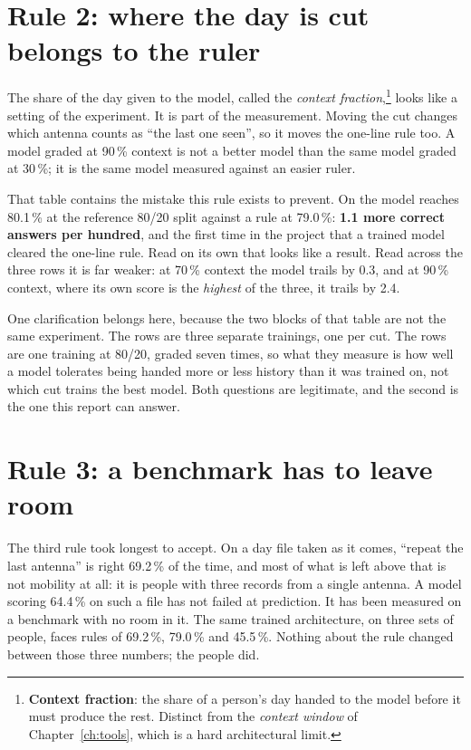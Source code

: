 \section{Rule 2: where the day is cut belongs to the ruler}

The share of the day given to the model, called the \emph{context
fraction},\footnote{\textbf{Context fraction}: the share of a person's day handed
to the model before it must produce the rest. Distinct from the \emph{context
window} of Chapter~\ref{ch:tools}, which is a hard architectural limit.} looks
like a setting of the experiment. It is part of the measurement. Moving the cut
changes which antenna counts as ``the last one seen'', so it moves the one-line
rule too. A model graded at 90\,\% context is not a better model than the same
model graded at 30\,\%; it is the same model measured against an easier ruler.



That table contains the mistake this rule exists to prevent. On \Dfilt{} the
model reaches 80.1\,\% at the reference 80/20 split against a rule at 79.0\,\%:
\textbf{1.1 more correct answers per hundred}, and the first time in the project
that a trained model cleared the one-line rule. Read on its own that looks like a
result. Read across the three rows it is far weaker: at 70\,\% context the model
trails by 0.3, and at 90\,\% context, where its own score is the \emph{highest}
of the three, it trails by 2.4.

One clarification belongs here, because the two blocks of that table are not the
same experiment. The \sfilt{} rows are three separate trainings, one per cut. The
\smob{} rows are one training at 80/20, graded seven times, so what they measure
is how well a model tolerates being handed more or less history than it was
trained on, not which cut trains the best model. Both questions are legitimate,
and the second is the one this report can answer.

\section{Rule 3: a benchmark has to leave room}

The third rule took longest to accept. On a day file taken as it comes, ``repeat
the last antenna'' is right 69.2\,\% of the time, and most of what is left above
that is not mobility at all: it is people with three records from a single
antenna. A model scoring 64.4\,\% on such a file has not failed at prediction. It
has been measured on a benchmark with no room in it. The same trained
architecture, on three sets of people, faces rules of 69.2\,\%, 79.0\,\% and
45.5\,\%. Nothing about the rule changed between those three numbers; the people
did.

